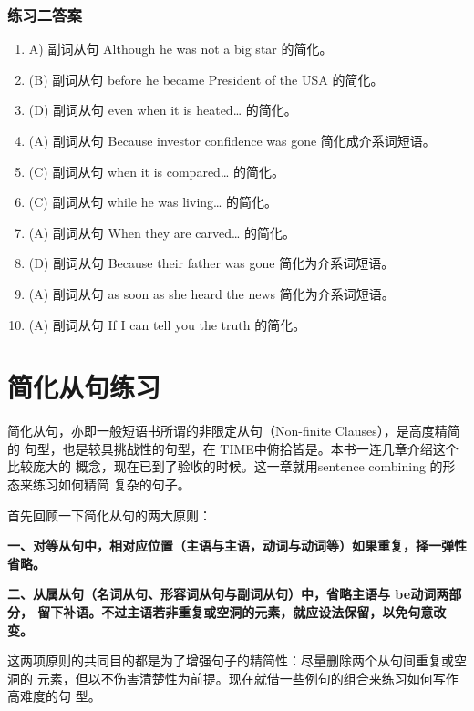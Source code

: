 \subsection{练习二答案}
\begin{enumerate}
\item A) 副词从句 Although he was not a big star 的简化。

\item(B) 副词从句 before he became President of the USA 的简化。

\item(D) 副词从句 even when it is heated… 的简化。

\item (A) 副词从句 Because investor confidence was gone 简化成介系词短语。

\item (C) 副词从句 when it is compared… 的简化。

\item (C) 副词从句 while he was living… 的简化。

\item (A) 副词从句 When they are carved… 的简化。

\item (D) 副词从句 Because their father was gone 简化为介系词短语。
\item (A) 副词从句 as soon as she heard the news 简化为介系词短语。
\item (A) 副词从句 If I can tell you the truth 的简化。
\end{enumerate}

\chapter{简化从句练习}

简化从句，亦即一般短语书所谓的非限定从句（Non-finite Clauses），是高度精简的
句型，也是较具挑战性的句型，在 TIME中俯拾皆是。本书一连几章介绍这个比较庞大的
概念，现在已到了验收的时候。这一章就用sentence combining 的形态来练习如何精简
复杂的句子。

首先回顾一下简化从句的两大原则：

\textbf{一、对等从句中，相对应位置（主语与主语，动词与动词等）如果重复，择一弹性省略。}

\textbf{二、从属从句（名词从句、形容词从句与副词从句）中，省略主语与 be动词两部分，
  留下补语。不过主语若非重复或空洞的元素，就应设法保留，以免句意改变。}

这两项原则的共同目的都是为了增强句子的精简性：尽量删除两个从句间重复或空洞的
元素，但以不伤害清楚性为前提。现在就借一些例句的组合来练习如何写作高难度的句
型。

